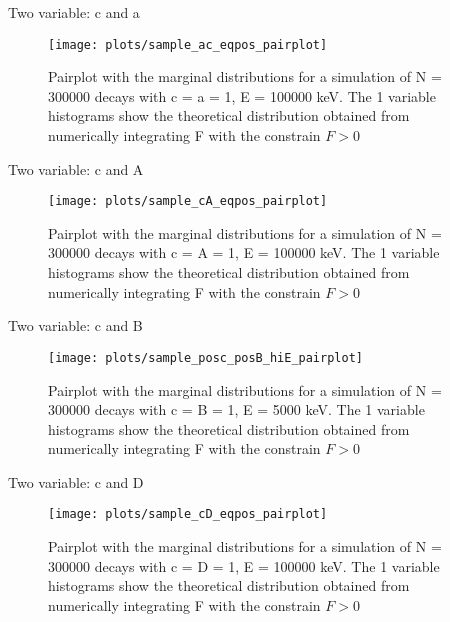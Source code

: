 \documentclass{beamer}
\begin{document}
\begin{frame}{Two variable: c and a}
	\begin{figure}
		\centering
		\texttt{[image: plots/sample\_ac\_eqpos\_pairplot]}
		\caption{Pairplot with the marginal distributions for a simulation of N = 300000 decays with c = a = 1, E = 100000 keV. The 1 variable histograms show the theoretical distribution obtained from numerically integrating F with the constrain $F > 0$}
	\end{figure}
\end{frame}
\begin{frame}{Two variable: c and A}
	\begin{figure}
		\centering
		\texttt{[image: plots/sample\_cA\_eqpos\_pairplot]}
		\caption{Pairplot with the marginal distributions for a simulation of N = 300000 decays with c = A = 1, E = 100000 keV. The 1 variable histograms show the theoretical distribution obtained from numerically integrating F with the constrain $F > 0$}
	\end{figure}
\end{frame}
\begin{frame}{Two variable: c and B}
\begin{figure}
	\centering
	\texttt{[image: plots/sample\_posc\_posB\_hiE\_pairplot]}
	\caption{Pairplot with the marginal distributions for a simulation of N = 300000 decays with c = B = 1, E = 5000 keV. The 1 variable histograms show the theoretical distribution obtained from numerically integrating F with the constrain $F > 0$}
\end{figure}
\end{frame}
\begin{frame}{Two variable: c and D}
\begin{figure}
	\centering
	\texttt{[image: plots/sample\_cD\_eqpos\_pairplot]}
	\caption{Pairplot with the marginal distributions for a simulation of N = 300000 decays with c = D = 1, E = 100000 keV. The 1 variable histograms show the theoretical distribution obtained from numerically integrating F with the constrain $F > 0$}
\end{figure}
\end{frame}
\end{document}
